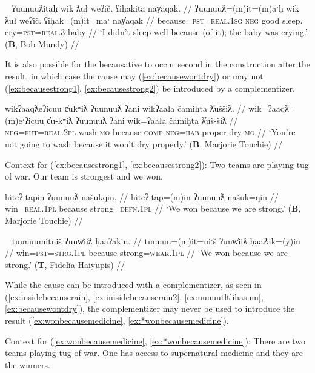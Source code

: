 \ex~ \label{ex:whydidntsleep}
\begingl
\glpreamble ʔuunuuƛitaḥ wik ƛuł weʔič. ʕiḥakita nay̓aqak. //
\gla ʔuunuuƛ=(m)it=(m)aˑḥ wik ƛuł weʔič. ʕiḥak=(m)it=maˑ nay̓aqak //
\glb because=\textsc{pst}=\textsc{real.1sg} \textsc{neg} good sleep. cry=\textsc{pst}=\textsc{real.3} baby //
\glft `I didn't sleep well because (of it); the baby was crying.' (\textbf{B}, Bob Mundy) //
\endgl
\xe

It is also possible for the becausative to occur second in the construction after the result, in which case the cause may (\ref{ex:becausewontdry}) or may not (\ref{ex:becausestrong1}, \ref{ex:becausestrong2}) be introduced by a complementizer.

\ex \label{ex:becausewontdry}
\begingl
\glpreamble wikʔaaqƛeʔicuu c̓ukʷiƛ ʔuunuuƛ ʔani wikʔaała čamiḥta ƛ̓uššiƛ. //
\gla wik=ʔaaqƛ=(m)eˑʔicuu c̓u-kʷiƛ ʔuunuuƛ ʔani wik=ʔaała čamiḥta ƛ̓uš-šiƛ //
\glb \textsc{neg}=\textsc{fut}=\textsc{real.2pl} wash-\textsc{mo} because \textsc{comp} \textsc{neg}=\textsc{hab} proper dry-\textsc{mo} //
\glft `You're not going to wash because it won't dry properly.' (\textbf{B}, Marjorie Touchie) //
\endgl
\xe

\vspace{5pt}

\noindent Context for (\ref{ex:becausestrong1}, \ref{ex:becausestrong2}): Two teams are playing tug of war. Our team is strongest and we won.

\ex \label{ex:becausestrong1}
\begingl
\glpreamble hiteʔitapin ʔuunuuƛ našukqin. //
\gla hiteʔitap=(m)in ʔuunuuƛ našuk=qin //
\glb win=\textsc{real.1pl} because strong=\textsc{defn.1pl} //
\glft `We won because we are strong.' (\textbf{B}, Marjorie Touchie) //
\endgl
\xe

\ex~ \label{ex:becausestrong2}
\begingl
\glpreamble tuunuumitniš ʔunw̓iiƛ ḥaaʔakin. //
\gla tuunuu=(m)it=niˑš ʔunw̓iiƛ ḥaaʔak=(y)in //
\glb win=\textsc{pst}=\textsc{strg.1pl} because strong=\textsc{weak.1pl} //
\glft `We won because we are strong.' (\textbf{T}, Fidelia Haiyupis) //
\endgl
\xe


While the cause can be introduced with a complementizer, as seen in (\ref{ex:insidebecauserain}, \ref{ex:inisidebecauserain2}, \ref{ex:uunuutltlihasum}, \ref{ex:becausewontdry}), the complementizer may never be used to introduce the result (\ref{ex:wonbecausemedicine}, \ref{ex:*wonbecausemedicine}).

\vspace{5pt}

\noindent Context for (\ref{ex:wonbecausemedicine}, \ref{ex:*wonbecausemedicine}): There are two teams playing tug-of-war. One has access to supernatural medicine and they are the winners.

